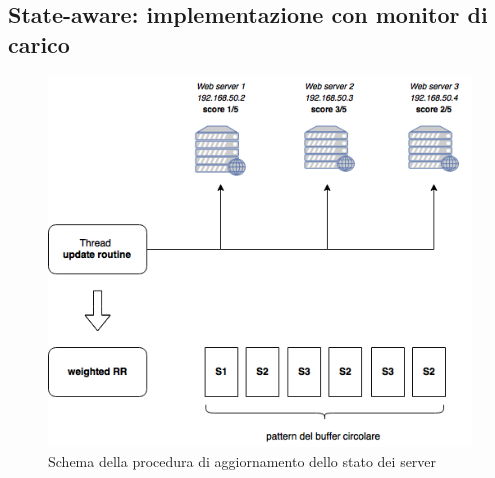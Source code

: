\documentclass[italian]{tktltiki2}
\begin{document}
\subsection{State-aware: implementazione con monitor di carico}

\begin{figure}[t]
\centering
\includegraphics[width=\textwidth]{images/rrobin_stateaware}
\caption{Schema della procedura di aggiornamento dello stato dei server
\label{fig:rrobin_sa}}
\end{figure}
\end{document}
